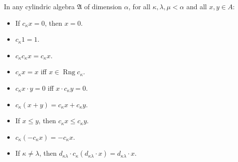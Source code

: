 In any cylindric algebra $\mathfrak{A}$ of dimension $\alpha$, for all $\kappa, \lambda, \mu < \alpha$ and all $x, y \in A$:

\begin{itemize}
\item[(i)] If $c_\kappa x = 0$, then $x = 0$.
\item[(ii)] $c_\kappa 1 = 1$.
\item[(iii)] $c_\kappa c_\kappa x = c_\kappa x$.
\item[(iv)] $c_\kappa x = x$ iff $x \in \operatorname{Rng} c_\kappa$.
\item[(v)] $c_\kappa x \cdot y = 0$ iff $x \cdot c_\kappa y = 0$.
\item[(vi)] $c_\kappa(x + y) = c_\kappa x + c_\kappa y$.
\item[(vii)] If $x \leq y$, then $c_\kappa x \leq c_\kappa y$.
\item[(viii)] $c_\kappa(-c_\kappa x) = -c_\kappa x$.
\item[(ix)] If $\kappa \neq \lambda$, then $d_{\kappa\lambda} \cdot c_\kappa(d_{\kappa\lambda} \cdot x) = d_{\kappa\lambda} \cdot x$.
\end{itemize}
